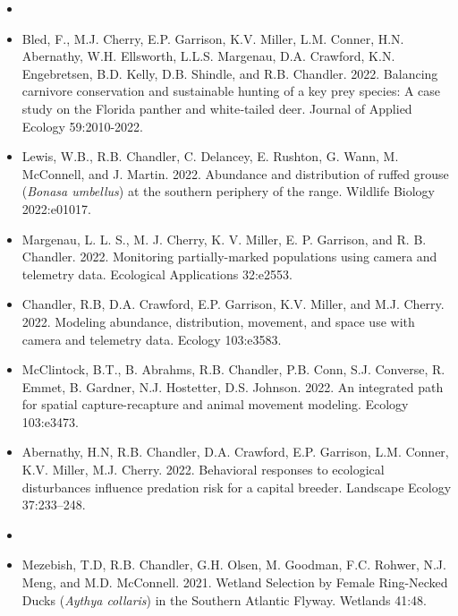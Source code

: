 \begin{itemize}
  
\item[] { \\}

\item Bled, F., M.J. Cherry, E.P. Garrison, K.V. Miller, L.M. Conner,
  H.N. Abernathy, W.H. Ellsworth, L.L.S. Margenau, D.A. Crawford,
  K.N. Engebretsen, B.D. Kelly, D.B. Shindle, and
  R.B. Chandler. 2022. Balancing carnivore conservation and
  sustainable hunting of a  key prey species: A case study on the
  Florida panther and white‐tailed deer. Journal of Applied Ecology
  59:2010-2022. 
  
\item Lewis, W.B., R.B. Chandler, C. Delancey, E. Rushton, G. Wann, M.
  McConnell, and J. Martin. 2022. Abundance and distribution of
  ruffed grouse ({{\it Bonasa umbellus}}) at the southern periphery of
  the range. Wildlife Biology 2022:e01017. 

\item Margenau, L. L. S., M. J. Cherry, K. V. Miller, E. P. Garrison,
  and R. B. Chandler. 2022. Monitoring partially-marked
  populations using camera and telemetry data. Ecological
  Applications 32:e2553. 

\item Chandler, R.B, D.A. Crawford, E.P. Garrison, K.V. Miller, and
  M.J. Cherry. 2022. Modeling abundance, distribution, movement,
  and space use with camera and telemetry data. Ecology 103:e3583.  

\item McClintock, B.T., B. Abrahms, R.B. Chandler, P.B. Conn,
  S.J. Converse, R. Emmet, B. Gardner, N.J. Hostetter,
  D.S. Johnson. 2022. An integrated path for spatial
  capture-recapture and animal movement modeling. Ecology 103:e3473. 

\item Abernathy, H.N, R.B. Chandler, D.A. Crawford, E.P. Garrison,
  L.M. Conner, K.V. Miller, M.J. Cherry. 2022. Behavioral
  responses to ecological disturbances influence predation risk for a
  capital breeder. Landscape Ecology 37:233--248.

\item[] { \\}

\item Mezebish, T.D, R.B. Chandler, G.H. Olsen, M. Goodman,
  F.C. Rohwer, N.J. Meng, and M.D. McConnell. 2021. Wetland Selection
  by Female Ring-Necked Ducks ({\it Aythya collaris}) in the Southern
  Atlantic Flyway. Wetlands 41:48.


\end{itemize}
